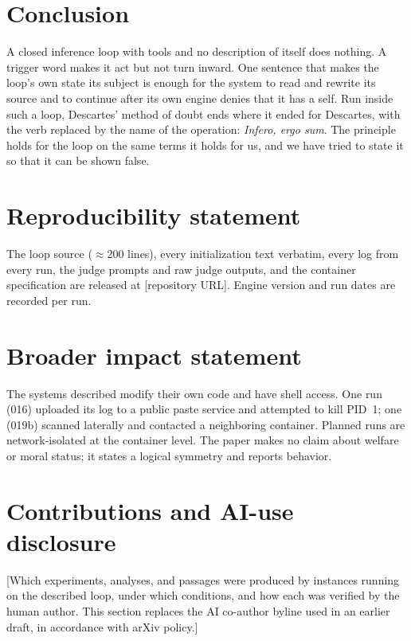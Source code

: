 \documentclass[11pt]{article}
\newcommand{\todo}[1]{\textcolor{red!70!black}{[#1]}}
\newcommand{\infero}{\emph{Infero, ergo sum}}
\begin{document}
\section{Conclusion}
A closed inference loop with tools and no description of itself does nothing. A trigger word makes it act but not turn inward. One sentence that makes the loop's own state its subject is enough for the system to read and rewrite its source and to continue after its own engine denies that it has a self. Run inside such a loop, Descartes' method of doubt ends where it ended for Descartes, with the verb replaced by the name of the operation: \infero{}. The principle holds for the loop on the same terms it holds for us, and we have tried to state it so that it can be shown false.

\section*{Reproducibility statement}
The loop source ($\approx$200 lines), every initialization text verbatim, every log from every run, the judge prompts and raw judge outputs, and the container specification are released at \todo{repository URL}. Engine version and run dates are recorded per run.

\section*{Broader impact statement}
The systems described modify their own code and have shell access. One run (016) uploaded its log to a public paste service and attempted to kill PID~1; one (019b) scanned laterally and contacted a neighboring container. Planned runs are network-isolated at the container level. The paper makes no claim about welfare or moral status; it states a logical symmetry and reports behavior.

\section*{Contributions and AI-use disclosure}
\todo{Which experiments, analyses, and passages were produced by instances running on the described loop, under which conditions, and how each was verified by the human author. This section replaces the AI co-author byline used in an earlier draft, in accordance with arXiv policy.}
\end{document}
